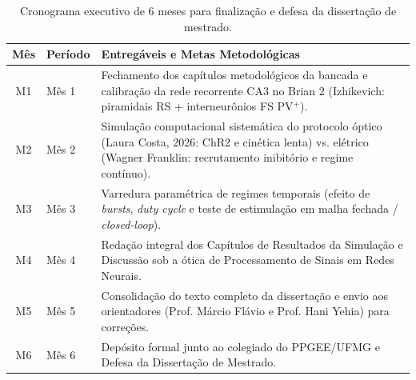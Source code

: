 \begin{table}[tbp]
    \centering
    \small
    \caption{Cronograma executivo de 6 meses para finalização e defesa da dissertação de mestrado.}
    \label{tab:cronograma}
    \begin{tabular}{clp{11.5cm}}
        \toprule
        Mês & Período & Entregáveis e Metas Metodológicas                                                                                                                                             \\
        \midrule
        M1  & Mês 1   & Fechamento dos capítulos metodológicos da bancada e calibração da rede recorrente CA3 no Brian 2 (Izhikevich: piramidais RS + interneurônios FS PV$^+$).                      \\
        M2  & Mês 2   & Simulação computacional sistemática do protocolo óptico (Laura Costa, 2026: ChR2 e cinética lenta) vs. elétrico (Wagner Franklin: recrutamento inibitório e regime contínuo). \\
        M3  & Mês 3   & Varredura paramétrica de regimes temporais (efeito de \emph{bursts}, \emph{duty cycle} e teste de estimulação em malha fechada / \emph{closed-loop}).                         \\
        M4  & Mês 4   & Redação integral dos Capítulos de Resultados da Simulação e Discussão sob a ótica de Processamento de Sinais em Redes Neurais.                                                \\
        M5  & Mês 5   & Consolidação do texto completo da dissertação e envio aos orientadores (Prof. Márcio Flávio e Prof. Hani Yehia) para correções.                                               \\
        M6  & Mês 6   & Depósito formal junto ao colegiado do PPGEE/UFMG e Defesa da Dissertação de Mestrado.                                                                                         \\
        \bottomrule
    \end{tabular}
\end{table}